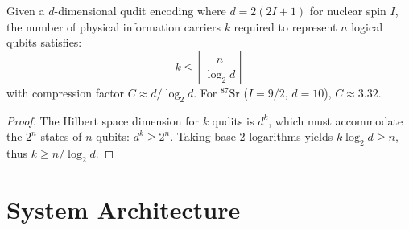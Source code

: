 \documentclass[12pt, a4paper]{article}
\begin{document}
\begin{theorem}
Given a $d$-dimensional qudit encoding where $d = 2(2I+1)$ for nuclear spin $I$, the number of physical information carriers $k$ required to represent $n$ logical qubits satisfies:
\begin{equation}
k \leq \left\lceil \frac{n}{\log_2 d} \right\rceil
\end{equation}
with compression factor $C \approx d/\log_2 d$. For $^{87}\text{Sr}$ ($I=9/2$, $d=10$), $C \approx 3.32$.
\end{theorem}

\begin{proof}
The Hilbert space dimension for $k$ qudits is $d^k$, which must accommodate the $2^n$ states of $n$ qubits: $d^k \geq 2^n$. Taking base-2 logarithms yields $k \log_2 d \geq n$, thus $k \geq n/\log_2 d$.
\end{proof}

\section{System Architecture}
\label{sec:architecture}
\end{document}
